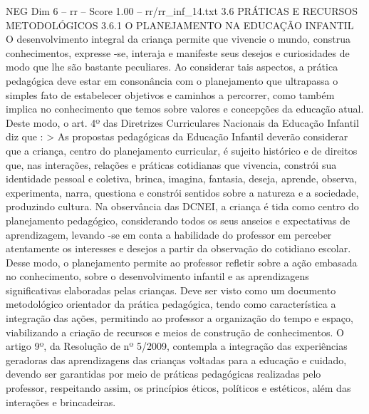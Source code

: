 \begin{textsample}{NEG Dim 6 – rr – Score 1.00 – rr/rr\_inf\_14.txt}  \label{ex:f6_neg_074}
3.6 PRÁTICAS E RECURSOS METODOLÓGICOS 3.6.1 O PLANEJAMENTO NA EDUCAÇÃO INFANTIL O desenvolvimento integral da criança permite que vivencie o mundo, construa conhecimentos, expresse -se, interaja e manifeste seus desejos e curiosidades de modo que lhe são bastante peculiares.
Ao considerar tais aspectos, a prática pedagógica deve estar em consonância com o planejamento que ultrapassa o simples fato de estabelecer objetivos e caminhos a percorrer, como também implica no conhecimento que temos sobre valores e concepções da educação atual.
Deste modo, o art. 4º das Diretrizes Curriculares Nacionais da Educação Infantil diz que : > As propostas pedagógicas da Educação Infantil deverão considerar que a criança, centro do planejamento curricular, é sujeito histórico e de direitos que, nas interações, relações e práticas cotidianas que vivencia, constrói sua identidade pessoal e coletiva, brinca, imagina, fantasia, deseja, aprende, observa, experimenta, narra, questiona e constrói sentidos sobre a natureza e a sociedade, produzindo cultura.
Na observância das DCNEI, a criança é tida como centro do planejamento pedagógico, considerando todos os seus anseios e expectativas de aprendizagem, levando -se em conta a habilidade do professor em perceber atentamente os interesses e desejos a partir da observação do cotidiano escolar.
Desse modo, o planejamento permite ao professor refletir sobre a ação embasada no conhecimento, sobre o desenvolvimento infantil e as aprendizagens significativas elaboradas pelas crianças.
Deve ser visto como um documento metodológico orientador da prática pedagógica, tendo como característica a integração das ações, permitindo ao professor a organização do tempo e espaço, viabilizando a criação de recursos e meios de construção de conhecimentos.
O artigo 9º, da Resolução de nº 5/2009, contempla a integração das experiências geradoras das aprendizagens das crianças voltadas para a educação e cuidado, devendo ser garantidas por meio de práticas pedagógicas realizadas pelo professor, respeitando assim, os princípios éticos, políticos e estéticos, além das interações e brincadeiras.

\end{textsample}
